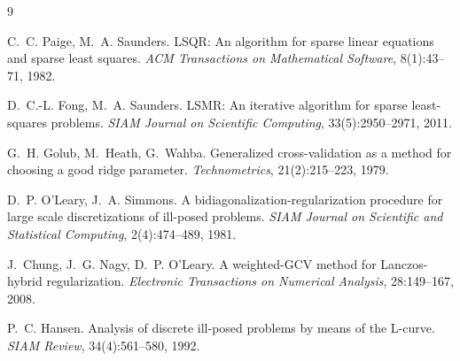 \documentclass[11pt,a4paper]{article}
\begin{document}
\begin{thebibliography}{9}

C.~C. Paige, M.~A. Saunders.
\newblock LSQR: An algorithm for sparse linear equations and sparse least squares.
\newblock \emph{ACM Transactions on Mathematical Software},
8(1):43--71, 1982.

D.~C.-L. Fong, M.~A. Saunders.
\newblock LSMR: An iterative algorithm for sparse least-squares problems.
\newblock \emph{SIAM Journal on Scientific Computing},
33(5):2950--2971, 2011.

G.~H. Golub, M.~Heath, G.~Wahba.
\newblock Generalized cross-validation as a method for choosing a good ridge parameter.
\newblock \emph{Technometrics},
21(2):215--223, 1979.

D.~P. O'Leary, J.~A. Simmons.
\newblock A bidiagonalization-regularization procedure for large scale
discretizations of ill-posed problems.
\newblock \emph{SIAM Journal on Scientific and Statistical Computing},
2(4):474--489, 1981.

J.~Chung, J.~G. Nagy, D.~P. O'Leary.
\newblock A weighted-GCV method for Lanczos-hybrid regularization.
\newblock \emph{Electronic Transactions on Numerical Analysis},
28:149--167, 2008.

P.~C. Hansen.
\newblock Analysis of discrete ill-posed problems by means of the L-curve.
\newblock \emph{SIAM Review},
34(4):561--580, 1992.

\end{thebibliography}
\end{document}

